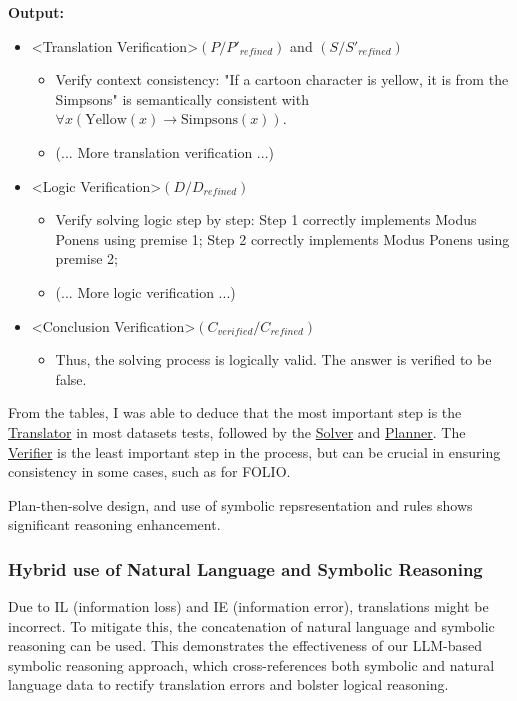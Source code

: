 \documentclass[10pt,a4paper]{article}
\begin{document}
\begin{multicols}{2}
{\begin{minipage}{9cm}
\textbf{Output:}
\begin{itemize}
    \item \textless Translation Verification\textgreater $(P / P'_{refined})$ and $(S / S'_{refined})$
    \begin{itemize}
        \item Verify context consistency: "If a cartoon character is yellow, it is from the Simpsons" is semantically consistent with $\forall x (\text{Yellow}(x) \rightarrow \text{Simpsons}(x))$.
        \item (... More translation verification ...)
    \end{itemize}
    \item \textless Logic Verification\textgreater $(D / D_{refined})$
    \begin{itemize}
        \item Verify solving logic step by step: Step 1 correctly implements Modus Ponens using premise 1; Step 2 correctly implements Modus Ponens using premise 2;
        \item (... More logic verification ...)
    \end{itemize}
    \item \textless Conclusion Verification\textgreater $(C_{verified} / C_{refined})$
    \begin{itemize}
        \item Thus, the solving process is logically valid. The answer is verified to be false.
    \end{itemize}
\end{itemize}
\end{minipage}}

From the tables, I was able to deduce that the most important step is the \underline{Translator} in most datasets tests, followed by the \underline{Solver} and \underline{Planner}. The \underline{Verifier} is the least important step in the process, but can be crucial in ensuring consistency in some cases, such as for FOLIO.

Plan-then-solve design, and use of symbolic repsresentation and rules shows significant reasoning enhancement.

\subsubsection*{Hybrid use of Natural Language and Symbolic Reasoning}

Due to IL (information loss) and IE (information error), translations might be incorrect. To mitigate this, the concatenation of natural language and symbolic reasoning can be used. This demonstrates the effectiveness of our LLM-based symbolic reasoning approach, which cross-references both symbolic and natural language data to rectify translation errors and bolster logical reasoning.


\end{multicols}
\end{document}
